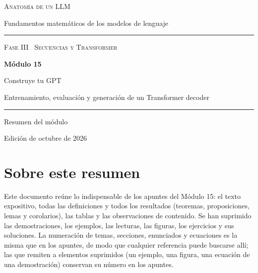 \documentclass[11pt,a4paper,twoside,openany]{book}
\begin{document}
\frontmatter
\begin{titlepage}
\centering
\vspace*{2.5cm}
{\large\scshape Anatomía de un LLM}\par
\vspace{0.4cm}
{\normalsize Fundamentos matemáticos de los modelos de lenguaje}\par
\vspace{2.2cm}
\rule{\textwidth}{0.8pt}\par\vspace{0.5cm}
{\small\scshape Fase III \textperiodcentered\ Secuencias y Transformer}\par\vspace{0.3cm}
{\Huge\bfseries Módulo 15\par}\vspace{0.3cm}
{\LARGE Construye tu GPT\par}
\vspace{0.2cm}
{\large Entrenamiento, evaluación y generación de un Transformer decoder\par}
\vspace{0.5cm}\rule{\textwidth}{0.4pt}\par
\vspace{1.6cm}
{\large Resumen del módulo}\par
\vfill
{\small Edición de octubre de 2026}\par
\end{titlepage}

\chapter*{Sobre este resumen}

Este documento reúne lo indispensable de los apuntes del Módulo 15: el texto expositivo, todas las definiciones y todos los resultados (teoremas, proposiciones, lemas y corolarios), las tablas y las observaciones de contenido. Se han suprimido las demostraciones, los ejemplos, las lecturas, las figuras, los ejercicios y sus soluciones. La numeración de temas, secciones, enunciados y ecuaciones es la misma que en los apuntes, de modo que cualquier referencia puede buscarse allí; las que remiten a elementos suprimidos (un ejemplo, una figura, una ecuación de una demostración) conservan su número en los apuntes.
\end{document}
